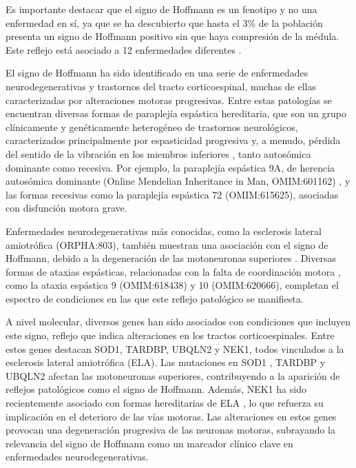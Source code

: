 Es importante destacar que el signo de Hoffmann es un fenotipo y no una enfermedad en sí, ya que se ha descubierto que hasta el 3\% de la población presenta un signo de Hoffmann positivo sin que haya compresión de la médula. Este reflejo está asociado a 12 enfermedades diferentes \cite{whitney}.

El signo de Hoffmann ha sido identificado en una serie de enfermedades neurodegenerativas y trastornos del tracto corticoespinal, muchas de ellas caracterizadas por alteraciones motoras progresivas. Entre estas patologías se encuentran diversas formas de paraplejía espástica hereditaria, que son un grupo clínicamente y genéticamente heterogéneo de trastornos neurológicos, caracterizados principalmente por espasticidad progresiva y, a menudo, pérdida del sentido de la vibración en los miembros inferiores \cite{Esteves2014}, tanto autosómica dominante como recesiva. Por ejemplo, la paraplejía espástica 9A, de herencia autosómica dominante (Online Mendelian Inheritance in Man, OMIM:601162) \cite{10.1093/brain/awv143}, y las formas recesivas como la paraplejía espástica 72 (OMIM:615625), asociadas con disfunción motora grave.

Enfermedades neurodegenerativas más conocidas, como la esclerosis lateral amiotrófica (ORPHA:803), también muestran una asociación con el signo de Hoffmann, debido a la degeneración de las motoneuronas superiores \cite{RIANCHO201927}. Diversas formas de ataxias espásticas, relacionadas con la falta de coordinación motora \cite{Pedroso2022}, como la ataxia espástica 9 (OMIM:618438) y 10 (OMIM:620666), completan el espectro de condiciones en las que este reflejo patológico se manifiesta.

A nivel molecular, diversos genes han sido asociados con condiciones que incluyen este signo, reflejo que indica alteraciones en los tractos corticoespinales. Entre estos genes destacan SOD1, TARDBP, UBQLN2 y NEK1, todos vinculados a la esclerosis lateral amiotrófica (ELA). Las mutaciones en SOD1 \cite{zhao2022g41d}, TARDBP \cite{sanchez2022atypical} y UBQLN2 \cite{teyssou:hal-03001781} afectan las motoneuronas superiores, contribuyendo a la aparición de reflejos patológicos como el signo de Hoffmann. Además, NEK1 ha sido recientemente asociado con formas hereditarias de ELA \cite{mann2023NEK1}, lo que refuerza su implicación en el deterioro de las vías motoras. Las alteraciones en estos genes provocan una degeneración progresiva de las neuronas motoras, subrayando la relevancia del signo de Hoffmann como un marcador clínico clave en enfermedades neurodegenerativas.

